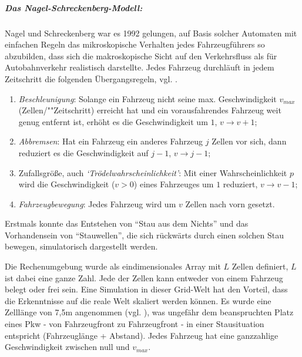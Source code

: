 \subparagraph{Das Nagel-Schreckenberg-Modell:}
\label{sec:na-sch}

Nagel und Schreckenberg war es 1992 gelungen, auf Basis solcher Automaten mit einfachen Regeln das mikroskopische Verhalten jedes Fahr\-zeug\-füh\-rers so abzubilden, dass sich die makroskopische Sicht auf den Verkehrsfluss als für Autobahnverkehr realistisch darstellte. 
Jedes Fahrzeug durchläuft in jedem Zeitschritt die folgenden Übergangsregeln, vgl. \cite{na-sch}. 

\begin{enumerate}
	\item \textit{Beschleunigung}: Solange ein Fahrzeug nicht seine max. Geschwindigkeit $v_{max}$ (Zellen/""Zeitschritt) erreicht hat und ein vorausfahrendes Fahrzeug weit genug entfernt ist, erhöht es die Geschwindigkeit um $1$, $v \rightarrow v+1$;
	\item \textit{Abbremsen}: Hat ein Fahrzeug ein anderes Fahrzeug $j$ Zellen vor sich, dann reduziert es die Geschwindigkeit auf $j-1$, $v \rightarrow j-1$;
	\item Zufallsgröße, auch \textit{\enquote*{Trödelwahrscheinlichkeit}}: Mit einer Wahrscheinlichkeit $p$ wird die Geschwindigkeit ($v > 0$) eines Fahrzeuges um $1$ reduziert, $v \rightarrow v-1$;
	\item \textit{Fahrzeugbewegung}: Jedes Fahrzeug wird um $v$ Zellen nach vorn gesetzt.
\end{enumerate}

\noindent
Erstmals konnte das Entstehen von \enquote{Stau aus dem Nichts} und das Vorhandensein von \enquote{Stauwellen}, die sich rückwärts durch einen solchen Stau bewegen, simulatorisch dargestellt werden.

Die Rechenumgebung wurde als eindimensionales Array mit $L$ Zellen definiert, $L$ ist dabei eine ganze Zahl. 
Jede der Zellen kann entweder von einem Fahrzeug belegt oder frei sein. 
Eine Simulation in dieser Grid-Welt hat den Vorteil, dass die Erkenntnisse auf die reale Welt skaliert werden können. 
Es wurde eine Zelllänge von 7,5\nolinebreak[4] m angenommen (vgl. \cite[S. 2227]{na-sch}), was ungefähr dem beanspruchten Platz eines Pkw - von Fahrzeugfront zu Fahrzeugfront - in einer Stausituation entspricht (Fahrzeuglänge + Abstand). 
Jedes Fahrzeug hat eine ganzzahlige Geschwindigkeit zwischen null und $v_{max}$.

